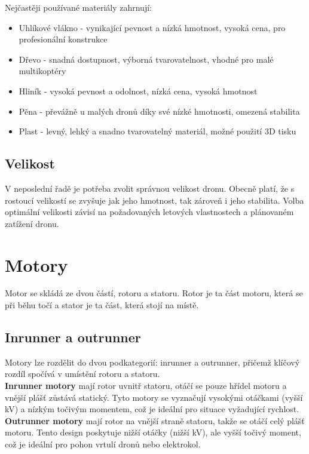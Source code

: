 \documentclass[12pt]{report}
\begin{document}
Nejčastěji používané materiály zahrnují:
\begin{itemize}
	\item Uhlíkové vlákno - vynikající pevnost a nízká hmotnost, vysoká cena, pro profesionální konstrukce
	\item Dřevo - snadná dostupnost, výborná tvarovatelnost, vhodné pro malé multikoptéry
	\item Hliník - vysoká pevnost a odolnost, nízká cena, vysoká hmotnost
	\item Pěna - převážně u malých dronů díky své nízké hmotnosti, omezená stabilita
	\item Plast - levný, lehký a snadno tvarovatelný materiál, možné použití 3D tisku
\end{itemize}

\subsection[Velikost]{Velikost}
V neposlední řadě je potřeba zvolit správnou velikost dronu. Obecně platí, že s rostoucí velikostí se zvyšuje jak jeho hmotnost, tak zároveň i jeho stabilita. Volba optimální velikosti závisí na požadovaných letových vlastnostech a plánovaném zatížení dronu. \cite{mainbook} \cite{dojo} \cite{ultimateguide}

\section[Motory]{Motory}
Motor se skládá ze dvou částí, rotoru a statoru. Rotor je ta část motoru, která se při běhu točí a stator je ta část, která stojí na místě.

\subsection[Inrunner a outrunner]{Inrunner a outrunner}
Motory lze rozdělit do dvou podkategorií: inrunner a outrunner, přičemž klíčový rozdíl spočívá v umístění rotoru a statoru.\\
\textbf{Inrunner motory} mají rotor uvnitř statoru, otáčí se pouze hřídel motoru a vnější plášť zůstává statický. Tyto motory se vyznačují vysokými otáčkami (vyšší kV) a nízkým točivým momentem, což je ideální pro situace vyžadující rychlost.\\
\textbf{Outrunner motory} mají rotor na vnější straně statoru, takže se otáčí celý plášť motoru. Tento design poskytuje nižší otáčky (nižší kV), ale vyšší točivý moment, což je ideální pro pohon vrtulí dronů nebo elektrokol. 
\end{document}
